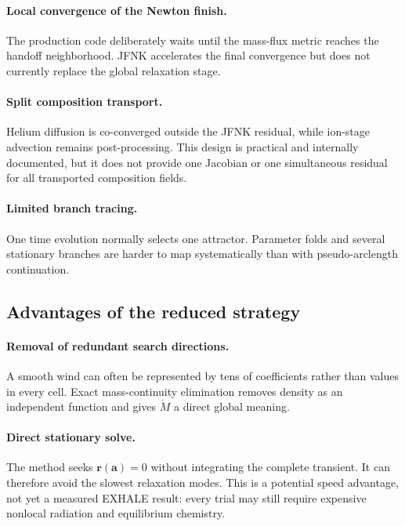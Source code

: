 \documentclass[english,a4paper]{my_memo}
\newcommand{\vect}[1]{\mathbf{#1}}
\newcommand{\coef}{\vect{a}}
\newcommand{\mdot}{\dot M}
\begin{document}
\paragraph{Local convergence of the Newton finish.}
The production code deliberately waits until the mass-flux metric reaches the
handoff neighborhood.  JFNK accelerates the final convergence but does not
currently replace the global relaxation stage.

\paragraph{Split composition transport.}
Helium diffusion is co-converged outside the JFNK residual, while ion-stage
advection remains post-processing.  This design is practical and internally
documented, but it does not provide one Jacobian or one simultaneous residual
for all transported composition fields.

\paragraph{Limited branch tracing.}
One time evolution normally selects one attractor.  Parameter folds and several
stationary branches are harder to map systematically than with
pseudo-arclength continuation.

\subsection{Advantages of the reduced strategy}

\paragraph{Removal of redundant search directions.}
A smooth wind can often be represented by tens of coefficients rather than
values in every cell.  Exact mass-continuity elimination removes density as an
independent function and gives \(\mdot\) a direct global meaning.

\paragraph{Direct stationary solve.}
The method seeks \(\vect{r}(\coef)=0\) without integrating the complete transient.
It can therefore avoid the slowest relaxation modes.  This is a potential
speed advantage, not yet a measured EXHALE result: every trial may still require
expensive nonlocal radiation and equilibrium chemistry.
\end{document}
